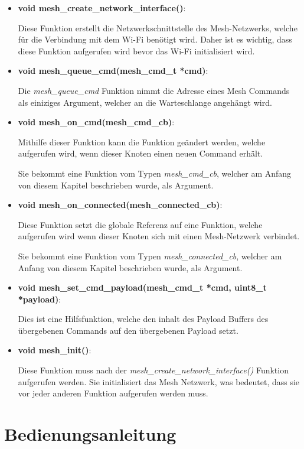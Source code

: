 \begin{itemize}
    \item \textbf{void mesh\_create\_network\_interface()}:
    
    Diese Funktion erstellt die Netzwerkschnittstelle des Mesh-Netzwerks, welche für die Verbindung mit dem Wi-Fi benötigt wird. Daher ist es wichtig, dass diese Funktion aufgerufen wird bevor das Wi-Fi initialisiert wird.

    \item \textbf{void mesh\_queue\_cmd(mesh\_cmd\_t *cmd)}:

    Die \textit{mesh\_queue\_cmd} Funktion nimmt die Adresse eines Mesh Commands als einiziges Argument, welcher an die Warteschlange angehängt wird. 

    \item \textbf{void mesh\_on\_cmd(mesh\_cmd\_cb)}:
    
    Mithilfe dieser Funktion kann die Funktion geändert werden, welche aufgerufen wird, wenn dieser Knoten einen neuen Command erhält.

    Sie bekommt eine Funktion vom Typen \textit{mesh\_cmd\_cb}, welcher am Anfang von diesem Kapitel beschrieben wurde, als Argument.

    \item \textbf{void mesh\_on\_connected(mesh\_connected\_cb)}:
    
    Diese Funktion setzt die globale Referenz auf eine Funktion, welche aufgerufen wird wenn dieser Knoten sich mit einen Mesh-Netzwerk verbindet.
    
    Sie bekommt eine Funktion vom Typen \textit{mesh\_connected\_cb}, welcher am Anfang von diesem Kapitel beschrieben wurde, als Argument.

    \item \textbf{void mesh\_set\_cmd\_payload(mesh\_cmd\_t *cmd, uint8\_t *payload)}:
    
    Dies ist eine Hilfsfunktion, welche den inhalt des Payload Buffers des übergebenen Commands auf den übergebenen Payload setzt.

    \item \textbf{void mesh\_init()}:
    
    Diese Funktion muss nach der \textit{mesh\_create\_network\_interface()} Funktion aufgerufen werden. Sie initialisiert das Mesh Netzwerk, was bedeutet, dass sie vor jeder anderen Funktion aufgerufen werden muss.
\end{itemize}

\section{Bedienungsanleitung}

